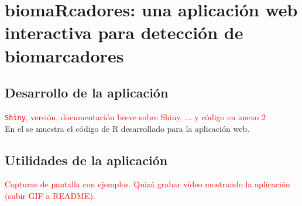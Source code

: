 \chapter{biomaRcadores: una aplicación web interactiva para detección de biomarcadores}

\section{Desarrollo de la aplicación}

\textcolor{red}{\texttt{Shiny}, versión, documentación breve sobre Shiny, ... y código en anexo 2}\\

En el  se muestra el código de R desarrollado para la aplicación web.

\section{Utilidades de la aplicación}

\textcolor{red}{Capturas de pantalla con ejemplos. Quizá grabar vídeo mostrando la aplicación (subir GIF a README).}